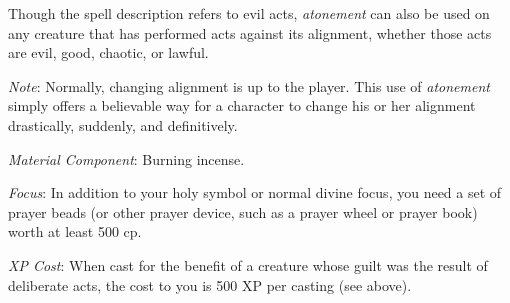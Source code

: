 {	Though the spell description refers to evil acts, \emph{atonement} can also be used on any creature that has performed acts against its alignment, whether those acts are evil, good, chaotic, or lawful.

	\textit{Note}: Normally, changing alignment is up to the player. This use of \emph{atonement} simply offers a believable way for a character to change his or her alignment drastically, suddenly, and definitively.

	\textit{Material Component}:
	Burning incense.

	\textit{Focus}:
	In addition to your holy symbol or normal divine focus, you need a set of prayer beads (or other prayer device, such as a prayer wheel or prayer book) worth at least 500 cp.

	\textit{XP Cost}:
	When cast for the benefit of a creature whose guilt was the result of deliberate acts, the cost to you is 500 XP per casting (see above).

}
